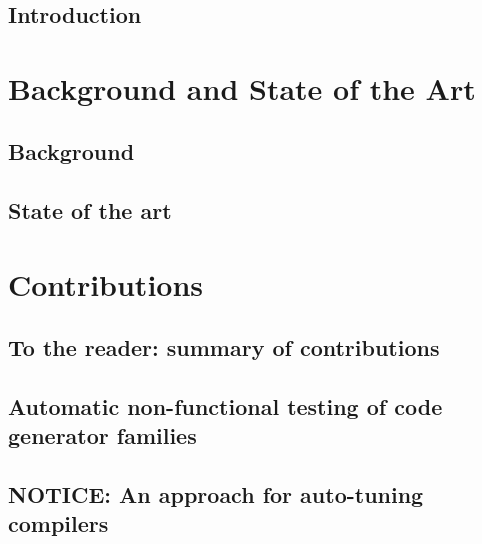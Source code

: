 \documentclass[letterpaper,12pt,titlepage, english, openright]{book}
\let\origdoublepage\cleardoublepage
\newcommand{\clearemptydoublepage}{%
  \clearpage{\pagestyle{empty}\origdoublepage}}
\let\cleardoublepage\clearemptydoublepage
\begin{document}



~\cleardoublepage


\frontmatter

\tableofcontents%

 

\mainmatter
%
\chapter[Introduction]{Introduction}\label{chap:intro}

\part{Background and State of the Art}
\chapter[Background]{Background}\label{chap:background}

\chapter[State of the art]{State of the art}\label{chap:SOTA}

\part{Contributions}
\chapter*{To the reader: summary of contributions}\label{chap:summary}

\chapter[Automatic non-functional testing of code generator families]{Automatic non-functional testing of code generator families}\label{chap:code generators}

\chapter[NOTICE: An approach for auto-tuning compilers]{NOTICE: An approach for auto-tuning compilers}\label{chap:compilers}

\end{document}
